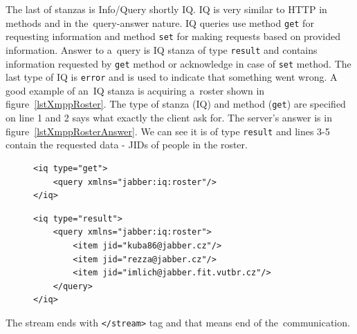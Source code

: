 The last of stanzas is Info/Query shortly IQ. IQ is very similar to HTTP in methods and in the~query-answer nature. IQ queries use method \verb|get| for requesting information and method \verb|set| for making requests based on provided information. Answer to a~query is IQ stanza of type \verb|result| and contains information requested by \verb|get| method or acknowledge in case of \verb|set| method. The last type of IQ is \verb|error| and is used to indicate that something went wrong. A good example of an~IQ stanza is acquiring a~roster shown in figure~\ref{lstXmppRoster}. The type of stanza (IQ) and method (\verb|get|) are specified on line 1 and 2 says what exactly the client ask for. The server's answer is in figure~\ref{lstXmppRosterAnswer}. We can see it is of type \verb|result| and lines 3-5 contain the requested data - JIDs of people in the roster.

\begin{figure}[h]
\begin{lstlisting}
<iq type="get">
	<query xmlns="jabber:iq:roster"/>
</iq>
\end{lstlisting}
\end{figure}

\begin{figure}[h]
\begin{lstlisting}
<iq type="result">
	<query xmlns="jabber:iq:roster">
		<item jid="kuba86@jabber.cz"/>
		<item jid="rezza@jabber.cz"/>
		<item jid="imlich@jabber.fit.vutbr.cz"/>
	</query>
</iq>
\end{lstlisting}
\end{figure}

The stream ends with \verb|</stream>| tag and that means end of the~communication. 

